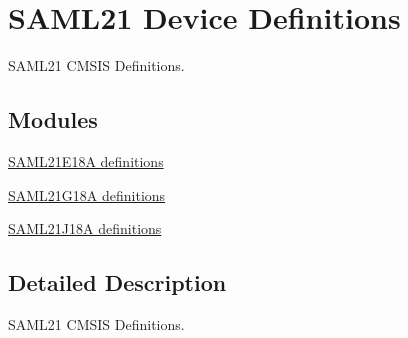 \hypertarget{group___s_a_m_l21__definitions}{}\section{S\+A\+M\+L21 Device Definitions}
\label{group___s_a_m_l21__definitions}


S\+A\+M\+L21 C\+M\+S\+I\+S Definitions.  


\subsection*{Modules}
\begin{DoxyCompactItemize}
\item 
\hyperlink{group___s_a_m_l21_e18_a__definitions}{S\+A\+M\+L21\+E18\+A definitions}
\item 
\hyperlink{group___s_a_m_l21_g18_a__definitions}{S\+A\+M\+L21\+G18\+A definitions}
\item 
\hyperlink{group___s_a_m_l21_j18_a__definitions}{S\+A\+M\+L21\+J18\+A definitions}
\end{DoxyCompactItemize}


\subsection{Detailed Description}
S\+A\+M\+L21 C\+M\+S\+I\+S Definitions. 

